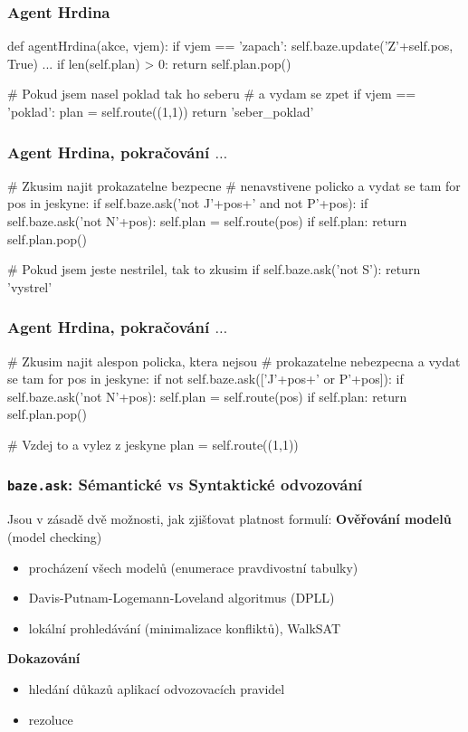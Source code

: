 \documentclass[red,professionalfont]{beamer}
\theoremstyle{definition}
\newcommand{\0}{\mbox{${\bf 0}$}}
\renewcommand{\emph}[1]{{\bf #1}}
\begin{document}
\begin{frame}[fragile]\frametitle{Agent Hrdina}
\begin{python}
def agentHrdina(akce, vjem):
  if vjem == 'zapach':
    self.baze.update('Z'+self.pos, True)
  ...
  if len(self.plan) > 0:
    return self.plan.pop()
  
  # Pokud jsem nasel poklad tak ho seberu 
  # a vydam se zpet
  if vjem == 'poklad':
    plan = self.route((1,1))
    return 'seber_poklad'
\end{python}
\end{frame}
\begin{frame}[fragile]\frametitle{Agent Hrdina, pokračování $\ldots$}
\begin{python}
  # Zkusim najit prokazatelne bezpecne 
  # nenavstivene policko a vydat se tam
  for pos in jeskyne:
    if self.baze.ask('not J'+pos+' and not P'+pos):
      if self.baze.ask('not N'+pos):
        self.plan = self.route(pos)
        if self.plan:
          return self.plan.pop()
  
  # Pokud jsem jeste nestrilel, tak to zkusim
  if self.baze.ask('not S'):
    return 'vystrel'
\end{python}
\end{frame}
\begin{frame}[fragile]\frametitle{Agent Hrdina, pokračování $\ldots$}
\begin{python}
    
  # Zkusim najit alespon policka, ktera nejsou 
  # prokazatelne nebezpecna a vydat se tam
  for pos in jeskyne:
    if not self.baze.ask(['J'+pos+' or P'+pos]):
      if self.baze.ask('not N'+pos):
        self.plan = self.route(pos)
        if self.plan:
          return self.plan.pop()
  
  # Vzdej to a vylez z jeskyne
  plan = self.route((1,1))
\end{python}
\end{frame}


\begin{frame}\frametitle{{\tt baze.ask}: Sémantické vs Syntaktické odvozování}
Jsou v zásadě dvě možnosti, jak zjišťovat platnost formulí:\pause
\vskip0.5cm
\emph{Ověřování modelů} (model checking)\pause
 \begin{itemize}
 \item procházení všech modelů (enumerace pravdivostní tabulky)\pause
 \item Davis-Putnam-Logemann-Loveland algoritmus (DPLL)\pause
 \item lokální prohledávání (minimalizace konfliktů), WalkSAT\pause
 \end{itemize}
\emph{Dokazování}\pause
 \begin{itemize}
  \item hledání důkazů aplikací odvozovacích pravidel\pause
  \item rezoluce
 \end{itemize}
\end{frame}
\end{document}
